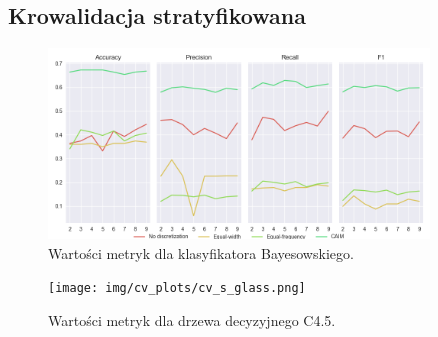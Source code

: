 \subsection*{Krowalidacja stratyfikowana}

\begin{figure}[H]
\center
    \includegraphics[width=0.9\textwidth]{img/cv_scores_stratifiedkfold/scoring_stratifiedkfold_glass.png}
    \caption{Wartości metryk dla klasyfikatora Bayesowskiego.}
\end{figure}

\begin{figure}[H]
    \center
    \texttt{[image: img/cv\_plots/cv\_s\_glass.png]}
    \caption{Wartości metryk dla drzewa decyzyjnego C4.5.}
\end{figure}


